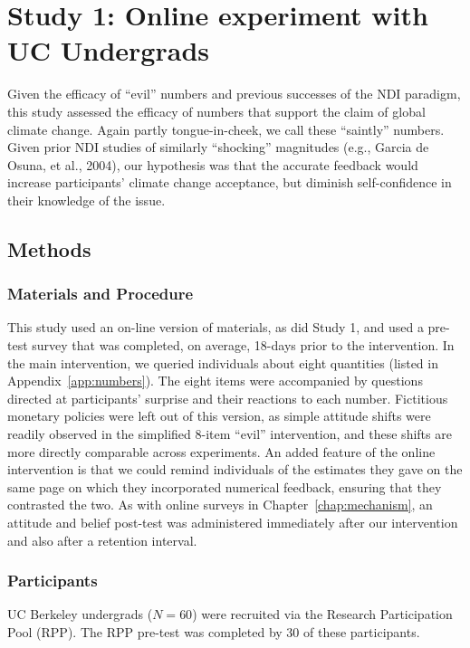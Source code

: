 \section{Study 1: Online experiment with UC Undergrads}

Given the efficacy of “evil” numbers and previous successes of the NDI paradigm,
this study assessed the efficacy of numbers that support the claim of global
climate change. Again partly tongue-in-cheek, we call these “saintly” numbers.
Given prior NDI studies of similarly “shocking” magnitudes (e.g., Garcia de
Osuna, et al., 2004), our hypothesis was that the accurate feedback would
increase participants’ climate change acceptance, but diminish self-confidence
in their knowledge of the issue.


\subsection{Methods}

\subsubsection{Materials and Procedure}

This study used an on-line version of materials, as did Study 1, and used a
pre-test survey that was completed, on average, 18-days prior to the
intervention. In the main intervention, we queried individuals about eight
quantities (listed in Appendix~\ref{app:numbers}). The eight items were
accompanied by questions directed at participants’ surprise and their reactions
to each number. Fictitious monetary policies were left out of this version, as
simple attitude shifts were readily observed in the simplified 8-item “evil”
intervention, and these shifts are more directly comparable across experiments.
An added feature of the online intervention is that we could remind individuals
of the estimates they gave on the same page on which they incorporated numerical
feedback, ensuring that they contrasted the two. As with online surveys in
Chapter~\ref{chap:mechanism}, an attitude and belief post-test was administered
immediately after our intervention and also after a retention interval.

\subsubsection{Participants}

UC Berkeley undergrads ($N=60$) were recruited via the Research Participation
Pool (RPP). The RPP pre-test was completed by 30 of these participants. 

